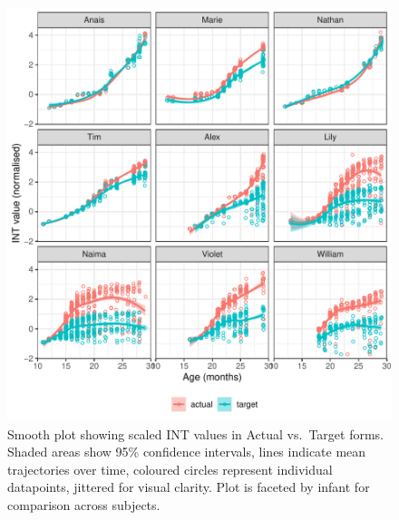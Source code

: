 \documentclass[
  man,floatsintext]{apa6}
\begin{document}
\begin{figure}
\centering
\includegraphics{PhonNetworksSupplementaryData_files/figure-latex/by-speaker-data-1.pdf}
\caption{\label{fig:by-speaker-data}Smooth plot showing scaled INT values in Actual vs.~Target forms. Shaded areas show 95\% confidence intervals, lines indicate mean trajectories over time, coloured circles represent individual datapoints, jittered for visual clarity. Plot is faceted by infant for comparison across subjects.}
\end{figure}

\newpage
\end{document}
